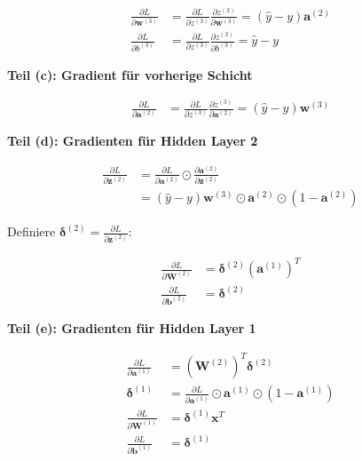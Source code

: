 ﻿\documentclass[12pt,a4paper]{article}
\begin{document}
\begin{align}
\frac{\partial L}{\partial \mathbf{w}^{(3)}} &= \frac{\partial L}{\partial z^{(3)}} \frac{\partial z^{(3)}}{\partial \mathbf{w}^{(3)}} = (\hat{y} - y) \mathbf{a}^{(2)} \\
\frac{\partial L}{\partial b^{(3)}} &= \frac{\partial L}{\partial z^{(3)}} \frac{\partial z^{(3)}}{\partial b^{(3)}} = \hat{y} - y
\end{align}

\textbf{Teil (c): Gradient für vorherige Schicht}

\begin{align}
\frac{\partial L}{\partial \mathbf{a}^{(2)}} &= \frac{\partial L}{\partial z^{(3)}} \frac{\partial z^{(3)}}{\partial \mathbf{a}^{(2)}} = (\hat{y} - y) \mathbf{w}^{(3)}
\end{align}

\textbf{Teil (d): Gradienten für Hidden Layer 2}

\begin{align}
\frac{\partial L}{\partial \mathbf{z}^{(2)}} &= \frac{\partial L}{\partial \mathbf{a}^{(2)}} \odot \frac{\partial \mathbf{a}^{(2)}}{\partial \mathbf{z}^{(2)}} \\
&= (\hat{y} - y) \mathbf{w}^{(3)} \odot \mathbf{a}^{(2)} \odot (1 - \mathbf{a}^{(2)})
\end{align}

Definiere $\boldsymbol{\delta}^{(2)} = \frac{\partial L}{\partial \mathbf{z}^{(2)}}$:

\begin{align}
\frac{\partial L}{\partial \mathbf{W}^{(2)}} &= \boldsymbol{\delta}^{(2)} (\mathbf{a}^{(1)})^T \\
\frac{\partial L}{\partial \mathbf{b}^{(2)}} &= \boldsymbol{\delta}^{(2)}
\end{align}

\textbf{Teil (e): Gradienten für Hidden Layer 1}

\begin{align}
\frac{\partial L}{\partial \mathbf{a}^{(1)}} &= (\mathbf{W}^{(2)})^T \boldsymbol{\delta}^{(2)} \\
\boldsymbol{\delta}^{(1)} &= \frac{\partial L}{\partial \mathbf{a}^{(1)}} \odot \mathbf{a}^{(1)} \odot (1 - \mathbf{a}^{(1)}) \\
\frac{\partial L}{\partial \mathbf{W}^{(1)}} &= \boldsymbol{\delta}^{(1)} \mathbf{x}^T \\
\frac{\partial L}{\partial \mathbf{b}^{(1)}} &= \boldsymbol{\delta}^{(1)}
\end{align}
\end{document}
